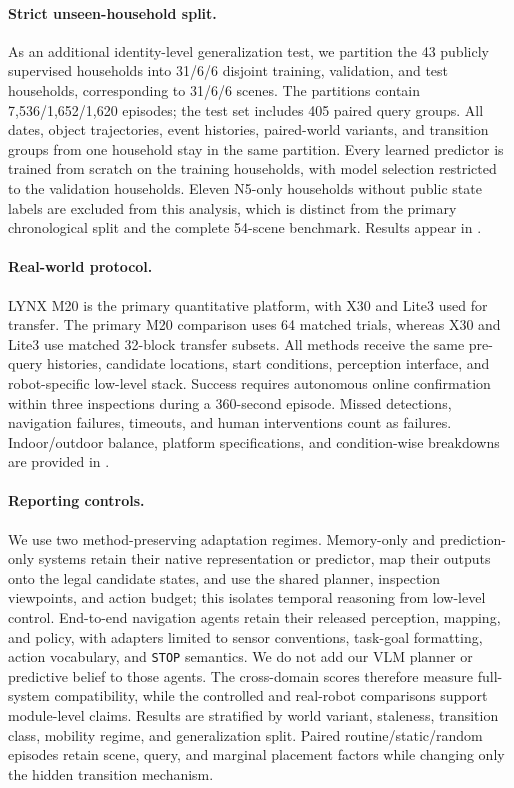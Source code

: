 \paragraph{Strict unseen-household split.}
As an additional identity-level generalization test, we partition the 43
publicly supervised households into 31/6/6 disjoint training, validation, and
test households, corresponding to 31/6/6 scenes. The partitions contain
7,536/1,652/1,620 episodes; the test set includes 405 paired query groups.
All dates, object trajectories, event histories, paired-world variants, and
transition groups from one household stay in the same partition. Every learned
predictor is trained from scratch on the training households, with model
selection restricted to the validation households. Eleven N5-only households
without public state labels are excluded from this analysis, which is distinct
from the primary chronological split and the complete 54-scene benchmark.
Results appear in .

\paragraph{Real-world protocol.}
LYNX M20 is the primary quantitative platform, with X30 and Lite3 used for
transfer. The primary M20 comparison uses 64 matched trials, whereas X30 and
Lite3 use matched 32-block transfer subsets. All methods receive the same
pre-query histories, candidate locations, start conditions, perception interface,
and robot-specific low-level stack. Success requires autonomous online
confirmation within three inspections during a 360-second episode. Missed
detections, navigation failures, timeouts, and human interventions count as
failures. Indoor/outdoor balance, platform specifications, and condition-wise
breakdowns are provided in .

\paragraph{Reporting controls.}
We use two method-preserving adaptation regimes. Memory-only and
prediction-only systems retain their native representation or predictor, map
their outputs onto the legal candidate states, and use the shared planner,
inspection viewpoints, and action budget; this isolates temporal reasoning
from low-level control. End-to-end navigation agents retain their released
perception, mapping, and policy, with adapters limited to sensor conventions,
task-goal formatting, action vocabulary, and \texttt{STOP} semantics. We do not
add our VLM planner or predictive belief to those agents. The cross-domain
scores therefore measure full-system compatibility, while the controlled
\evolvingworldbench{} and real-robot comparisons support module-level claims. Results are
stratified by world variant, staleness, transition class, mobility regime, and
generalization split. Paired routine/static/random episodes retain scene,
query, and marginal placement factors while changing only the hidden
transition mechanism.

